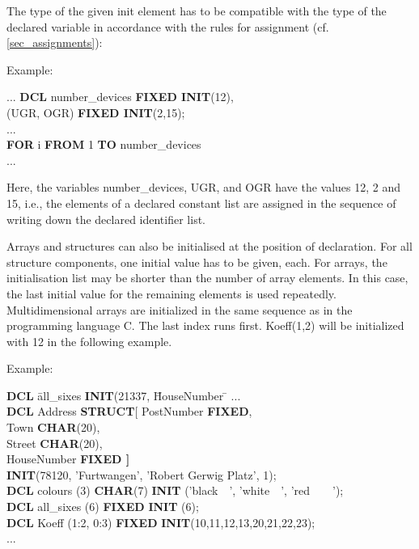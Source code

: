 The type of the given init element has to be compatible with the type of
the declared variable in accordance with the rules for assignment (cf.
\ref{sec_assignments}):

Example:

...
{\bf DCL} number\_devices {\bf FIXED INIT}(12),\\
\x (UGR, OGR) {\bf FIXED INIT}(2,15);\\
...\\
{\bf FOR} i {\bf FROM} 1 {\bf TO} number\_devices\\
...

Here, the variables number\_devices, UGR, and OGR have the values 12, 2
and 15, i.e., the elements of a declared constant list are assigned in
the sequence of writing down the declared identifier list.

Arrays and structures can also be initialised at the position of
declaration. For all structure components, one initial value has to be
given, each. For arrays, the initialisation list may be shorter than the
number of array elements. In this case, the last initial value for the
remaining elements is used repeatedly.
Multidimensional arrays are initialized in the same sequence as in the 
programming language C. The last index runs first.
Koeff(1,2) will be initialized with 12 in the following example.

Example:

\begin{tabbing}
{\bf DCL} \= all\_sixes \= {\bf INIT}(21337, \= HouseNumber \= \kill
... \> \> \> \> \\
{\bf DCL} \> Address \> {\bf STRUCT}[ \> PostNumber  \> {\bf FIXED},\\
          \>         \>               \> Town        \> {\bf CHAR}(20),\\
          \>         \>               \> Street      \> {\bf CHAR}(20),\\
          \>         \>               \> HouseNumber \> {\bf FIXED \hspace{1cm} ]}\\
          \>         \> {\bf INIT}(78120, 'Furtwangen', 'Robert Gerwig Platz', 1); \> \> \\
{\bf DCL} \> colours \> (3)           \> {\bf CHAR}(7) \> {\bf INIT} ('black\ \ ', 'white\ \ ', 'red\ \ \ \ ');\\
{\bf DCL} \> all\_sixes \> (6)        \> {\bf FIXED}  \> {\bf INIT} (6);\\
{\bf DCL} \> Koeff \> (1:2, 0:3) \> {\bf FIXED}	\> {\bf INIT}(10,11,12,13,20,21,22,23);\\
... \> \> \> \>
\end{tabbing}

